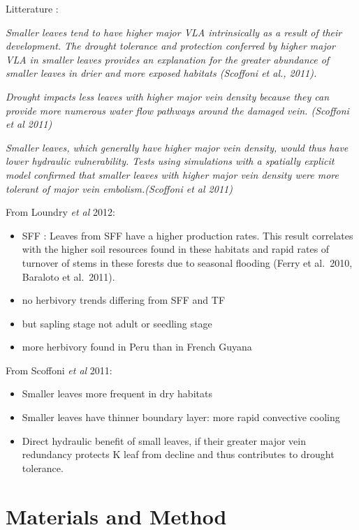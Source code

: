 \documentclass[
]{book}
\providecommand{\tightlist}{%
  \setlength{\itemsep}{0pt}\setlength{\parskip}{0pt}}
\begin{document}
Litterature :

\emph{Smaller leaves tend to have higher major VLA intrinsically as a result of their development. The drought tolerance and protection conferred by higher major VLA in smaller leaves provides an explanation for the greater abundance of smaller leaves in drier and more exposed habitats (Scoffoni et al., 2011).}

\emph{Drought impacts less leaves with higher major vein density because they can provide more numerous water flow pathways around the damaged vein. (Scoffoni et al 2011)}

\emph{Smaller leaves, which generally have higher major vein density, would thus have lower hydraulic vulnerability. Tests using simulations with a spatially explicit model confirmed that smaller leaves with higher major vein density were more tolerant of major vein embolism.(Scoffoni et al 2011)}

From Loundry \emph{et al} 2012:

\begin{itemize}
\tightlist
\item
  SFF : Leaves from SFF have a higher production rates. This result correlates with the higher soil resources found in
  these habitats and rapid rates of turnover of stems in
  these forests due to seasonal flooding (Ferry et al.~2010,
  Baraloto et al.~2011).
\item
  no herbivory trends differing from SFF and TF
\item
  but sapling stage not adult or seedling stage
\item
  more herbivory found in Peru than in French Guyana
\end{itemize}

From Scoffoni \emph{et al} 2011:

\begin{itemize}
\tightlist
\item
  Smaller leaves more frequent in dry habitats
\item
  Smaller leaves have thinner boundary layer: more rapid convective cooling\\
\item
  Direct hydraulic benefit of small leaves, if their greater major vein redundancy protects K leaf from decline and thus contributes to drought tolerance.
\end{itemize}

\hypertarget{materials-and-method}{%
\section{Materials and Method}\label{materials-and-method}}
\end{document}
